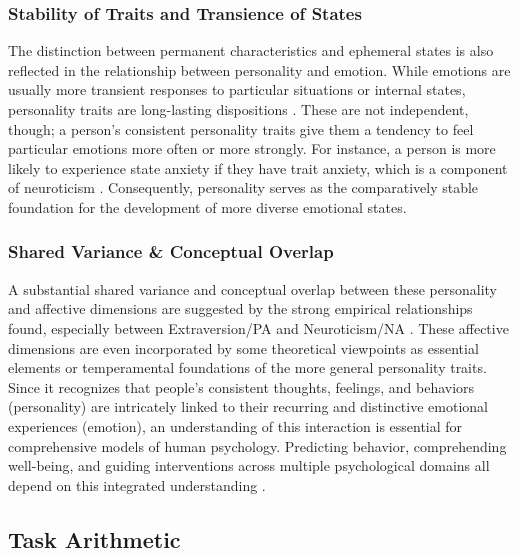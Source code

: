 \documentclass{DESSThesis}
\begin{document}
\subsubsection{Stability of Traits and Transience of States}
The distinction between permanent characteristics and ephemeral states is also reflected in the relationship between personality and emotion. While emotions are usually more transient responses to particular situations or internal states, personality traits are long-lasting dispositions \cite{david_watson_panas-x_1994,cobb-clark_stability_2012}. These are not independent, though; a person's consistent personality traits give them a tendency to feel particular emotions more often or more strongly. For instance, a person is more likely to experience state anxiety if they have trait anxiety, which is a component of neuroticism \cite{david_watson_panas-x_1994}. Consequently, personality serves as the comparatively stable foundation for the development of more diverse emotional states.

\subsubsection{Shared Variance \& Conceptual Overlap}
A substantial shared variance and conceptual overlap between these personality and affective dimensions are suggested by the strong empirical relationships found, especially between Extraversion/PA and Neuroticism/NA \cite{david_watson_panas-x_1994}. These affective dimensions are even incorporated by some theoretical viewpoints as essential elements or temperamental foundations of the more general personality traits. Since it recognizes that people's consistent thoughts, feelings, and behaviors (personality) are intricately linked to their recurring and distinctive emotional experiences (emotion), an understanding of this interaction is essential for comprehensive models of human psychology. Predicting behavior, comprehending well-being, and guiding interventions across multiple psychological domains all depend on this integrated understanding \cite{lerner_emotion_2015,oshio_resilience_2018}.

\subsection{Task Arithmetic}
\end{document}

